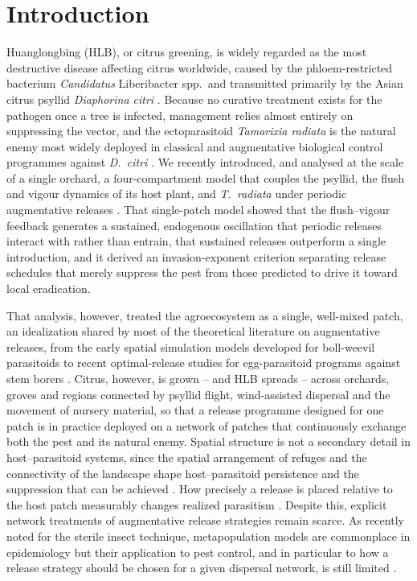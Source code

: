 \section{Introduction}
\label{sec:introduction}

Huanglongbing (HLB), or citrus greening, is widely regarded as the most destructive disease affecting citrus worldwide, caused by the phloem-restricted bacterium \textit{Candidatus} Liberibacter spp.\ and transmitted primarily by the Asian citrus psyllid \textit{Diaphorina citri} \citep{Bove2006,Halbert2004}. Because no curative treatment exists for the pathogen once a tree is infected, management relies almost entirely on suppressing the vector, and the ectoparasitoid \textit{Tamarixia radiata} is the natural enemy most widely deployed in classical and augmentative biological control programmes against \textit{D.\ citri} \citep{Hall2008, chen2014}. We recently introduced, and analysed at the scale of a single orchard, a four-compartment model that couples the psyllid, the flush and vigour dynamics of its host plant, and \textit{T.\ radiata} under periodic augmentative releases \citep{RodriguezFalcon2026}. That single-patch model showed that the flush--vigour feedback generates a sustained, endogenous oscillation that periodic releases interact with rather than entrain, that sustained releases outperform a single introduction, and it derived an invasion-exponent criterion separating release schedules that merely suppress the pest from those predicted to drive it toward local eradication.

That analysis, however, treated the agroecosystem as a single, well-mixed patch, an idealization shared by most of the theoretical literature on augmentative releases, from the early spatial simulation models developed for boll-weevil parasitoids \citep{ARCASIM1996} to recent optimal-release studies for egg-parasitoid programs against stem borers \citep{Diatraea2024}. Citrus, however, is grown -- and HLB spreads -- across orchards, groves and regions connected by psyllid flight, wind-assisted dispersal and the movement of nursery material, so that a release programme designed for one patch is in practice deployed on a network of patches that continuously exchange both the pest and its natural enemy. Spatial structure is not a secondary detail in host--parasitoid systems, since the spatial arrangement of refuges and the connectivity of the landscape shape host--parasitoid persistence and the suppression that can be achieved \citep{RefugeConnectivity2022}. How precisely a release is placed relative to the host patch measurably changes realized parasitism \citep{PatchDispersal2026}. Despite this, explicit network treatments of augmentative release strategies remain scarce. As recently noted for the sterile insect technique, metapopulation models are commonplace in epidemiology but their application to pest control, and in particular to how a release strategy should be chosen for a given dispersal network, is still limited \citep{SITMetapopulation2026}.

